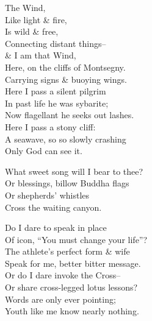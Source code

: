 The Wind, \\
Like light \& fire, \\
Is wild \& free, \\
Connecting distant things-- \\
\& I am that Wind, \\
Here, on the cliffs of Montsegny. \\
Carrying signs \& buoying wings. \\
Here I pass a silent pilgrim \\
In past life he was sybarite; \\
Now flagellant he seeks out lashes. \\
Here I pass a stony cliff: \\
A seawave, so so slowly crashing \\
Only God can see it.

What sweet song will I bear to thee? \\
Or blessings, billow Buddha flags \\
Or shepherds' whistles  \\
Cross the waiting canyon. 

Do I dare to speak in place  \\
Of icon, ``You must change your life''? \\
The athlete's perfect form \& wife \\
Speak for me, better bitter message. \\
Or do I dare invoke the Cross-- \\
Or share cross-legged lotus lessons? \\
Words are only ever pointing; \\
Youth like me know nearly nothing.
